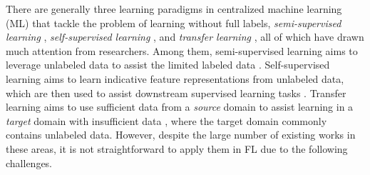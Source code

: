 \documentclass[11pt]{article}
\begin{document}
There are generally three learning paradigms in centralized machine learning (ML) that tackle the problem of learning without full labels, \textit{semi-supervised learning} \cite{zhu2005semi,chapelle2009semi}, \textit{self-supervised learning} \cite{liu2021self,jing2020self}, and \textit{transfer learning} \cite{pan2010survey}, all of which have drawn much attention from researchers. Among them, semi-supervised learning aims to leverage unlabeled data to assist the limited labeled data \cite{tarvainen2017mean,miyato2018virtual,berthelot2019mixmatch}. Self-supervised learning aims to learn indicative feature representations from unlabeled data, which are then used to assist downstream supervised learning tasks \cite{doersch2015unsupervised,gidaris2018unsupervised,he2022masked}. Transfer learning aims to use sufficient data from a \textit{source} domain to assist learning in a \textit{target} domain with insufficient data \cite{yosinski2014transferable,long2015learning,ganin2016domain}, where the target domain commonly contains unlabeled data. However, despite the large number of existing works in these areas, it is not straightforward to apply them in FL due to the following challenges. 
\end{document}
